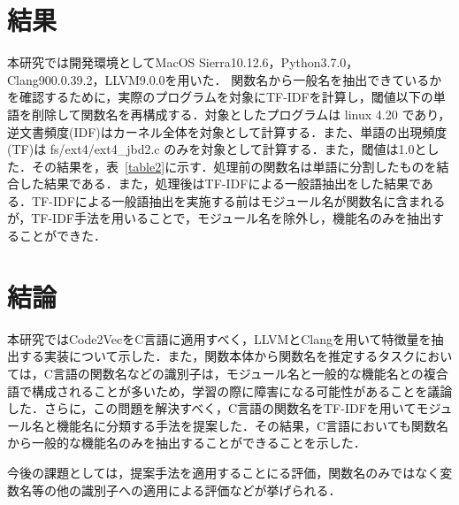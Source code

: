 \documentclass[submit,techrep,noauthor]{ipsj}
\begin{document}
\section{結果}
本研究では開発環境としてMacOS Sierra10.12.6，Python3.7.0，Clang900.0.39.2，LLVM9.0.0を用いた．
関数名から一般名を抽出できているかを確認するために，実際のプログラムを対象にTF-IDFを計算し，閾値以下の単語を削除して関数名を再構成する．対象としたプログラムは linux 4.20 であり，逆文書頻度(IDF)はカーネル全体を対象として計算する．また、単語の出現頻度(TF)は fs/ext4/ext4\_jbd2.c のみを対象として計算する．また，閾値は1.0とした．その結果を，表~\ref{table2}に示す．処理前の関数名は単語に分割したものを結合した結果である．また，処理後はTF-IDFによる一般語抽出をした結果である．TF-IDFによる一般語抽出を実施する前はモジュール名が関数名に含まれるが，TF-IDF手法を用いることで，モジュール名を除外し，機能名のみを抽出することができた．

\section{結論}
本研究ではCode2VecをC言語に適用すべく，LLVMとClangを用いて特徴量を抽出する実装について示した．また，関数本体から関数名を推定するタスクにおいては，C言語の関数名などの識別子は，モジュール名と一般的な機能名との複合語で構成されることが多いため，学習の際に障害になる可能性があることを議論した．さらに，この問題を解決すべく，C言語の関数名をTF-IDFを用いてモジュール名と機能名に分類する手法を提案した．その結果，C言語においても関数名から一般的な機能名のみを抽出することができることを示した．

今後の課題としては，提案手法を適用することにる評価，関数名のみではなく変数名等の他の識別子への適用による評価などが挙げられる．










\end{document}
